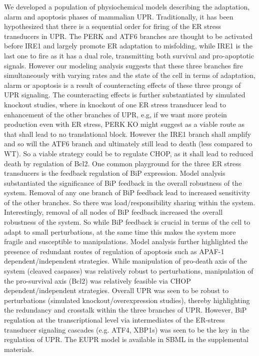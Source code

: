\documentclass[12pt]{article}
\begin{document}
We developed a population of physiochemical models describing the adaptation, alarm and apoptosis phases of mammalian UPR. Traditionally, it has been hypothesized that there is a sequential order for firing of the ER stress transducers in UPR. The PERK and ATF6 branches are thought to be activated before IRE1 \cite{szegezdi2006mediators} and largely promote ER adaptation to misfolding, while IRE1 is the last one to fire as it has a dual role, transmitting both survival and pro-apoptotic signals. However our modeling analysis suggests that these three branches fire simultaneously with varying rates and the state of the cell in terms of adaptation, alarm or apoptosis is a result of counteracting effects of these three prongs of UPR signaling. The counteracting effects is further substantiated by simulated knockout studies, where in knockout of one ER stress transducer lead to enhancement of the other branches of UPR, e.g, if we want more protein production even with ER stress, PERK KO might suggest as a viable route as that shall lead to no translational block. However the IRE1 branch shall amplify and so will the ATF6 branch and ultimately still lead to death (less compared to WT). So a viable strategy could be to regulate CHOP, as it shall lead to reduced death by regulation of Bcl2. One common playground for the three ER stress transducers is the feedback regulation of BiP expression. Model analysis substantiated the significance of BiP feedback in the overall robustness of the system. Removal of any one branch of BiP feedback lead to increased sensitivity of the other branches. So there was load/responsibility sharing within the system. Interestingly, removal of all nodes of BiP feedback increased the overall robustness of the system. So while BiP feedback is crucial in terms of the cell to adapt to small perturbations, at the same time this makes the system more fragile and susceptible to manipulations. Model analysis further highlighted the presence of redundant routes of regulation of apoptosis such as APAF-1 dependent/independent strategies. While manipulation of pro-death axis of the system (cleaved caspases) was relatively robust to perturbations, manipulation of the pro-survival axis (Bcl2) was relatively feasible via CHOP dependent/independent strategies. Overall UPR was seen to be robust to perturbations (simulated knockout/overexpression studies), thereby highlighting the redundancy and crosstalk within the three branches of UPR. However, BiP regulation at the transcriptional level via intermediates of the ER-stress transducer signaling cascades (e.g. ATF4, XBP1s) was seen to be the key in the regulation of UPR. The EUPR model is available in SBML in the supplemental materials.
\end{document}
